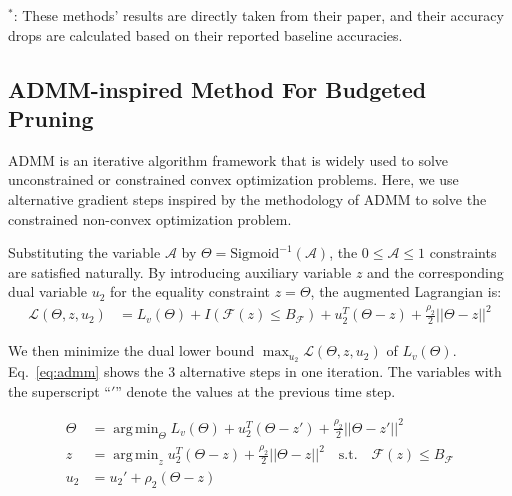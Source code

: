\documentclass[runningheads]{llncs}
\newcommand{\flops}{\mathcal{F}}
\DeclareMathOperator*{\argmin}{arg\,min}
\newcommand{\alphas}{\mathcal{A}}
\newcommand{\invas}{\Theta}
\newcommand{\lag}{\mathcal{L}}
\begin{document}
\begin{table}[H]
\begin{center}
\begin{minipage}{0.98\textwidth}
{      $^*$: These methods' results are directly taken from their paper, and their accuracy drops are calculated based on their reported baseline accuracies.
      }
    \end{minipage}
    \end{center}
    \end{table}

  
  \subsection{ADMM-inspired Method For Budgeted Pruning}
  \label{sec:admm_for_bp}
  
  
  ADMM is an iterative algorithm framework that is widely used to solve unconstrained or constrained convex optimization problems. Here,
  we use alternative gradient steps inspired by the methodology of ADMM to solve the constrained non-convex optimization problem.
  
  
  
  Substituting the variable $\alphas$ by $\invas = \mbox{Sigmoid}^{-1}(\alphas)$,
  the $0 \leq \alphas \leq 1$ constraints are satisfied naturally. 
  By introducing auxiliary variable $z$ and the corresponding dual variable $u_2$ for the equality constraint $z = \invas$, the augmented Lagrangian is:
  \begin{equation}
      \begin{aligned}
      \lag(\invas, z, u_2) &= L_v(\invas) + I(\flops(z) \leq B_\flops) + u_2^T (\invas - z) + \frac{\rho_2}{2} ||\invas - z||^2
      \end{aligned}
  \end{equation}
  
  We then minimize the dual lower bound $\max_{u_2} \lag(\invas, z, u_2)$ of $L_v(\invas)$.
  Eq.~\ref{eq:admm} shows the 3 alternative steps in one iteration. 
  The variables with the superscript ``$'$'' denote the values at the previous time step.
  
  \begin{equation}
      \begin{aligned}
      \invas &= \argmin_\invas L_v(\invas) +  u_2^T (\invas - z') + \frac{\rho_2}{2} ||\invas - z'||^2\\
      z &= \argmin_z u_2^T (\invas - z) + \frac{\rho_2}{2} ||\invas - z||^2 \quad\mbox{s.t.} \quad \flops(z) \leq B_\flops\\
      u_2 &= u_2' + \rho_2 (\invas - z)
      \end{aligned}
  \label{eq:admm}
  \end{equation}
  
\end{document}

